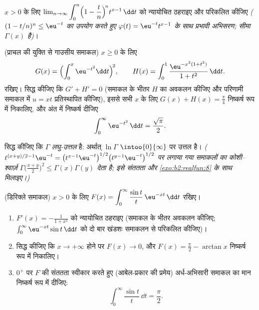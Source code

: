 \begin{exercise}[$\star\star$]\label{exo:b2:integration:7}
$x > 0$ के लिए $\lim_{n\to\infty} \displaystyle\int_0^n
\Bigl(1 - \frac tn\Bigr)^{\!n} t^{x-1}\,\dd t$ को न्यायोचित ठहराइए और परिकलित कीजिए \emph{($(1 - t/n)^n \leq \eu^{-t}$ का उपयोग
करते हुए $\varphi(t) = \eu^{-t}t^{x-1}$ के साथ प्रभावी अभिसरण; सीमा $\Gamma(x)$ है)}।
\end{exercise}

\begin{exercise}[$\star\star\star$]\label{exo:b2:integration:8}
(प्राचल की युक्ति से गाउसीय समाकल) $x \geq 0$ के लिए
\[
G(x) = \Bigl(\int_0^x \eu^{-t^2}\dd t\Bigr)^{\!2},
\qquad
H(x) = \int_0^1 \frac{\eu^{-x^2(1+t^2)}}{1 + t^2}\,\dd t .
\]
रखिए। सिद्ध कीजिए कि $G' + H' = 0$ (समाकल के भीतर $H$ का अवकलन कीजिए और परिणामी
समाकल में $u = xt$ प्रतिस्थापित कीजिए), इससे सभी $x$ के लिए $G(x) + H(x)
= \frac\pi4$ निष्कर्ष रूप
में निकालिए, और अंत में निष्कर्ष दीजिए
\[
\int_0^{\infty} \eu^{-t^2}\,\dd t = \frac{\sqrt\pi}{2} .
\]
\end{exercise}

\begin{exercise}[$\star\star\star$]\label{exo:b2:integration:9}
सिद्ध कीजिए कि $\Gamma$ \emph{लघु-उत्तल} है: अर्थात् $\ln\Gamma$ $\intoo{0}{\infty}$ पर उत्तल है।
\emph{($t^{(x+y)/2 - 1}\eu^{-t} = \bigl(t^{x-1}\eu^{-t}\bigr)^{1/2}
\bigl(t^{y-1}\eu^{-t}\bigr)^{1/2}$ पर लगाया गया समाकलों का कोशी--श्वार्ज़ $\Gamma\bigl(\frac{x+y}{2}\bigr)^2 \leq \Gamma(x)\Gamma(y)$ देता है; इसे
संततता और \cref{exo:b2:realfun:8} के साथ मिलाइए।)}
\end{exercise}

\begin{exercise}[$\star\star\star$]\label{exo:b2:integration:10}
(डिरिक्ले समाकल) $x > 0$ के लिए $F(x) = \displaystyle\int_0^{\infty}
\frac{\sin t}{t}\,\eu^{-xt}\,\dd t$ रखिए।
\begin{enumerate}
  \item $F'(x) = -\frac{1}{1 + x^2}$ को न्यायोचित ठहराइए (समाकल के भीतर अवकलन कीजिए; $\int_0^\infty \eu^{-xt}\sin t\,\dd
        t$ को दो
        बार खंडशः समाकलन से परिकलित कीजिए)।
  \item सिद्ध कीजिए कि $x \to +\infty$ होने पर $F(x) \to 0$, और $F(x) =
        \frac\pi2 - \arctan x$ निष्कर्ष रूप में
        निकालिए।
  \item $0^+$ पर $F$ की संततता स्वीकार करते हुए (आबेल-प्रकार की प्रमेय)
        अर्ध-अभिसारी समाकल का मान निष्कर्ष रूप में दीजिए:
        \[
        \int_0^{\infty} \frac{\sin t}{t}\,\dd t = \frac{\pi}{2}.
        \]
\end{enumerate}
\end{exercise}

